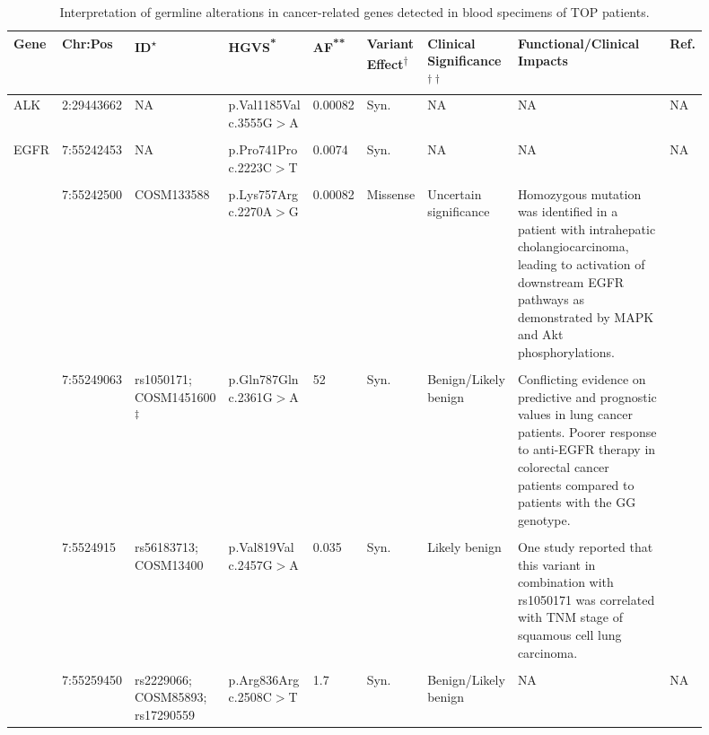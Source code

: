 
\begin{landscape}

\begin{longtable}{p{0.07\linewidth}|p{0.09\linewidth}p{0.11\linewidth}p{0.1\linewidth}p{0.05\linewidth}p{0.065\linewidth}p{0.11\linewidth}p{0.25\linewidth}p{0.05\linewidth}}
		\caption{Interpretation of germline alterations in cancer-related genes detected in blood specimens of TOP patients.}
    \label{tbl:germline_cancer_genes}
		\\
    \hline
    Gene & Chr:Pos & ID\textsuperscript{$\star$} & HGVS\textsuperscript{*} & AF\textsuperscript{**} & Variant Effect\textsuperscript{$\dagger$} & Clinical Significance\textsuperscript{$\dagger\dagger$} & Functional/Clinical Impacts & Ref.
		\\
    \hline
		ALK & 2:29443662 & NA & p.Val1185Val c.3555G$>$A & 0.00082 & Syn. & NA & NA & NA
		\\
		\\
		\hline
		EGFR & 7:55242453 & NA & p.Pro741Pro c.2223C$>$T & 0.0074 & Syn. & NA & NA & NA
		\\
		\\
		& 7:55242500 & COSM133588 & p.Lys757Arg c.2270A$>$G & 0.00082 & Missense & Uncertain \mbox{significance} & Homozygous mutation was identified in a patient with intrahepatic cholangiocarcinoma, leading to activation of downstream EGFR pathways as demonstrated by MAPK and Akt phosphorylations. & \cite{Leone2006}
		\\
		\\
		& 7:55249063 & rs1050171; COSM1451600\textsuperscript{$\ddagger$} & p.Gln787Gln c.2361G$>$A & 52 & Syn. & Benign/Likely benign & Conflicting evidence on predictive and prognostic values in lung cancer patients. Poorer response to anti-EGFR therapy in colorectal cancer patients compared to patients with the GG genotype. & \cite{Zhang2006a, Leichsenring2017, Wang2013, Bonin2016}
		\\
		\\
		& 7:5524915 & rs56183713; COSM13400 & p.Val819Val c.2457G$>$A & 0.035 & Syn. & Likely benign & One study reported that this variant in combination with rs1050171 was correlated with TNM stage of squamous cell lung carcinoma. & \cite{Wang2013}
		\\
		\\
		& 7:55259450 & rs2229066; COSM85893; rs17290559 & p.Arg836Arg c.2508C$>$T & 1.7 & Syn. & Benign/Likely benign & NA & NA

\end{longtable}
\end{landscape}
